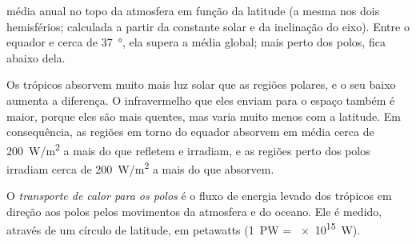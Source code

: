 \begin{omfigure}

{\small {} média anual no topo da atmosfera em função da latitude
(a mesma nos dois hemisférios; calculada a partir da constante solar e da
inclinação do eixo). Entre o equador e cerca de \qty{37}{\degree}, ela
supera a média global; mais perto dos polos, fica abaixo dela.}
\end{omfigure}

Os trópicos absorvem muito mais luz solar que as regiões polares, e o seu
 baixo aumenta a diferença. O infravermelho que eles enviam para o
espaço também é maior, porque eles são mais quentes, mas varia muito menos
com a latitude. Em consequência, as regiões em torno do equador absorvem
em média cerca de \qty{200}{W/m^2} a mais do que refletem e irradiam, e as
regiões perto dos polos irradiam cerca de \qty{200}{W/m^2} a mais do que
absorvem.

\begin{definition}\label{def:g10:earth-energy-budget:heat-transport}
O \emph{transporte de calor para os polos}
é o fluxo de energia levado dos trópicos em direção aos polos pelos
movimentos da atmosfera e do oceano. Ele é medido, através de um círculo de
latitude, em petawatts (\qty{1}{PW} = \qty{e15}{W}).
\end{definition}

